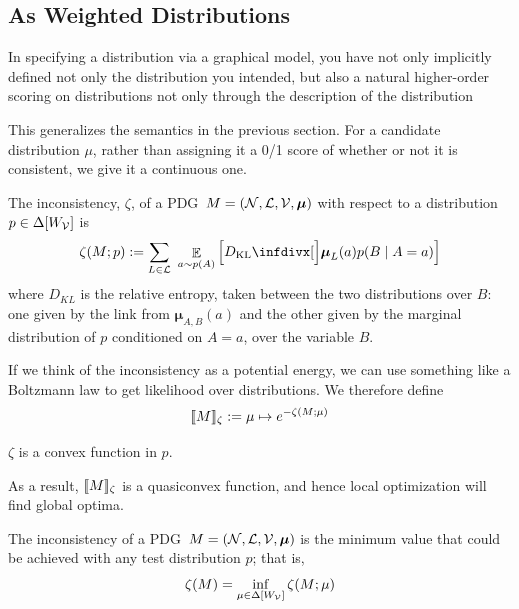 \documentclass{article}
\newcommand\changeon{\color{note-fg} }
\newcommand\bmu{\boldsymbol{\mu}}
\newcommand{\MN}{PDG}
\begin{document}
	\subsection{As Weighted Distributions}
	\changeon
	
	
	In specifying a distribution via a graphical model, you have not only implicitly defined not only the distribution you intended, but also a natural higher-order scoring on distributions not only through the description of the distribution 
	
 	This generalizes the semantics in the previous section. For a candidate distribution $\mu$, rather than assigning it a 0/1 score of whether or not it is consistent, we give it a continuous one.

	\begin{defn}
		The inconsistency, $\zeta$, of a \MN\ $M = (\cal N, L, V, \bmu)$ with respect to a distribution $p \in \Delta[W_{\cal V}]$ is
		\[
			\zeta(M ; p) := %
			\sum_{L \in \cal L}~\mathop{\mathbb E}_{a \sim p(A)} \left[\kldiv[\Big]{\bmu_{L}(a) }{ p(B \mid A = a) } \right]
		\]
		where $D_{KL}$ is the relative entropy, taken between the two distributions over $B$: one given by the link from $\bmu_{A,B}(a)$ and the other given by the marginal distribution of $p$ conditioned on $A = a$, over the variable $B$.
	\end{defn}	
	
	If we think of the inconsistency as a potential energy, we can use something like a Boltzmann law to get likelihood over distributions. We therefore define	
	\[\llbracket M\rrbracket_\zeta := \mu \mapsto e^{-\zeta(M;\mu)}\]


	\begin{prop}[restate=thmzetaconvex]
		$\zeta$ is a convex function in $p$.
	\end{prop}
	As a result, $\llbracket M\rrbracket_\zeta$ is a quasiconvex function, and hence local optimization will find global optima.

	\begin{defn}
		The inconsistency of a \MN\ $M = (\cal N, L, V, \bmu)$ is the minimum value that could be achieved with any test distribution $p$; that is, 
		\[ \zeta(M) = \inf_{ \mu \in \Delta [W_{\cal V}]} \zeta (M; \mu) 
			 \]
		
	\end{defn}
\end{document}

